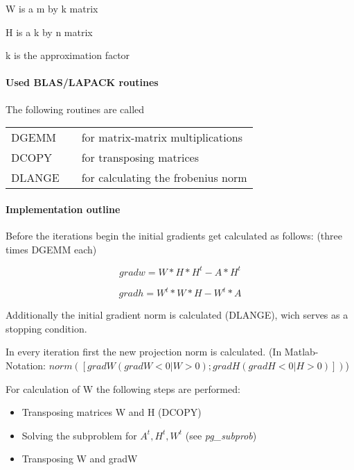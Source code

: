 \documentclass[a4paper,10pt]{scrartcl}
\begin{document}
 					W is a m by k matrix

 					H is a k by n matrix

 					k is the approximation factor


			\paragraph{Used BLAS/LAPACK routines}
	
					The following routines are called\newline

					\begin{tabular}{lcl}
						DGEMM && for matrix-matrix multiplications\\
						DCOPY && for transposing matrices\\
						DLANGE && for calculating the frobenius norm\\
					\end{tabular}

			\paragraph{Implementation outline}


					Before the iterations begin the initial gradients get calculated as 
					follows: (three times DGEMM each)\newline

					\begin{equation*}
						gradw = W * H * H^t - A * H^t
					\end{equation*}
					
					\begin{equation*}
						gradh = W^t * W * H - W^t * A
					\end{equation*}

					Additionally the initial gradient norm is calculated (DLANGE), wich
					serves as a stopping condition.\newline

					In every iteration first the new projection norm is calculated. (In 
					Matlab-Notation: $norm([gradW(gradW <0 | W > 0); gradH(gradH <0 | H > 0)])$)\newline

					For calculation of W the following steps are performed:\newline

					\begin{itemize}
					 \item Transposing matrices W and H (DCOPY)\newline
					 \item Solving the subproblem for $A^t, H^t, W^t$ (see 	
						\emph{pg\_subprob})\newline
					 \item Transposing W and gradW\newline
					\end{itemize}
\end{document}
